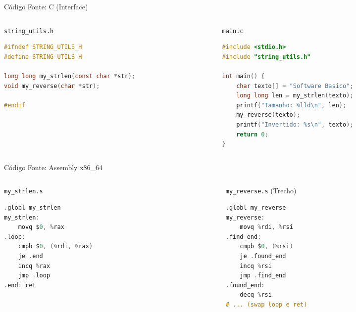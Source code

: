 \documentclass[aspectratio=169, 11pt]{beamer}
\begin{document}
\begin{frame}[fragile]{Código Fonte: C (Interface)}
  \begin{columns}[T]
    \begin{column}{0.48\textwidth}
      \begin{block}{\texttt{string\_utils.h}}
        \begin{lstlisting}[language=C]
#ifndef STRING_UTILS_H
#define STRING_UTILS_H

long long my_strlen(const char *str);
void my_reverse(char *str);

#endif
        \end{lstlisting}
      \end{block}
    \end{column}
    \begin{column}{0.48\textwidth}
      \begin{block}{\texttt{main.c}}
        \begin{lstlisting}[language=C]
#include <stdio.h>
#include "string_utils.h"

int main() {
    char texto[] = "Software Basico";
    long long len = my_strlen(texto);
    printf("Tamanho: %lld\n", len);
    my_reverse(texto);
    printf("Invertido: %s\n", texto);
    return 0;
}
        \end{lstlisting}
      \end{block}
    \end{column}
  \end{columns}
\end{frame}

\begin{frame}[fragile]{Código Fonte: Assembly x86\_64}
  \begin{columns}[T]
    \begin{column}{0.48\textwidth}
      \begin{block}{\texttt{my\_strlen.s}}
        \begin{lstlisting}[language=C]
.globl my_strlen
my_strlen:
    movq $0, %rax
.loop:
    cmpb $0, (%rdi, %rax)
    je .end
    incq %rax
    jmp .loop
.end: ret
        \end{lstlisting}
      \end{block}
    \end{column}
    \begin{column}{0.48\textwidth}
      \begin{block}{\texttt{my\_reverse.s} (Trecho)}
        \begin{lstlisting}[language=C]
.globl my_reverse
my_reverse:
    movq %rdi, %rsi
.find_end:
    cmpb $0, (%rsi)
    je .found_end
    incq %rsi
    jmp .find_end
.found_end:
    decq %rsi
# ... (swap loop e ret)
        \end{lstlisting}
      \end{block}
    \end{column}
  \end{columns}
\end{frame}
\end{document}
